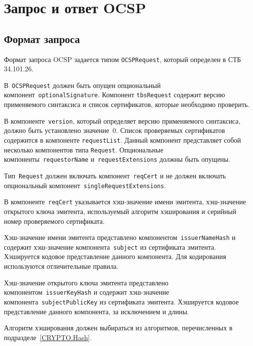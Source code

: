 \section{Запрос и ответ OCSP}\label{FMT.OCSP}

\subsection{Формат запроса}

Формат запроса OCSP задается типом \texttt{OCSPRequest}, который определен 
в СТБ 34.101.26. 

В~\texttt{OCSPRequest} должен быть опущен опциональный 
компонент~\texttt{optionalSignature}. Компонент \texttt{tbsRequest} содержит 
версию применяемого синтаксиса и список сертификатов, которые необходимо 
проверить.

В компоненте~\texttt{version}, который определяет версию применяемого 
синтаксиса, должно быть установлено значение~$0$.
Список проверяемых сертификатов содержится в компоненте
\texttt{requestList}. Данный компонент представляет собой 
несколько компонентов типа \texttt{Request}. Опциональные 
компоненты~\texttt{requestorName} и~\texttt{requestExtensions} должны быть 
опущены. 


Тип~\texttt{Request} должен включать компонент~\texttt{reqCert} и 
не должен включать опциональный компонент~\texttt{singleRequestExtensions}.

В компоненте~\texttt{reqCert} указывается хэш-значение имени эмитента, 
хэш-значение открытого ключа эмитента, используемый алгоритм 
хэширования и серийный номер проверяемого сертификата.

Хэш-значение имени эмитента представлено компонентом~\texttt{issuerNameHash} 
и содержит хэш-значение компонента~\texttt{subject} из сертификата 
эмитента. Хэшируется кодовое представление данного компонента. Для кодирования 
используются отличительные правила.

Хэш-значение открытого ключа эмитента представлено 
компонентом~\texttt{issuerKeyHash} и содержит хэш-значение 
компонента~\texttt{subjectPublicKey} из сертификата эмитента. Хэшируется 
кодовое представление данного компонента, за исключением  и длины.

Алгоритм хэширования должен выбираться из алгоритмов, перечисленных в 
подразделе~\ref{CRYPTO.Hash}.


